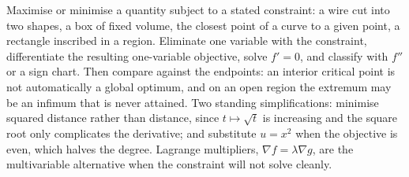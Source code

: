 \cue Maximise or minimise a quantity subject to a stated constraint: a wire cut into two shapes, a box of fixed volume, the closest point of a curve to a given point, a rectangle inscribed in a region.
\method Eliminate one variable with the constraint, differentiate the resulting one-variable objective, solve $f'=0$, and classify with $f''$ or a sign chart. Then compare against the endpoints: an interior critical point is not automatically a global optimum, and on an open region the extremum may be an infimum that is never attained. Two standing simplifications: minimise squared distance rather than distance, since $t\mapsto\sqrt t$ is increasing and the square root only complicates the derivative; and substitute $u=x^{2}$ when the objective is even, which halves the degree. Lagrange multipliers, $\nabla f=\lambda\nabla g$, are the multivariable alternative when the constraint will not solve cleanly.

